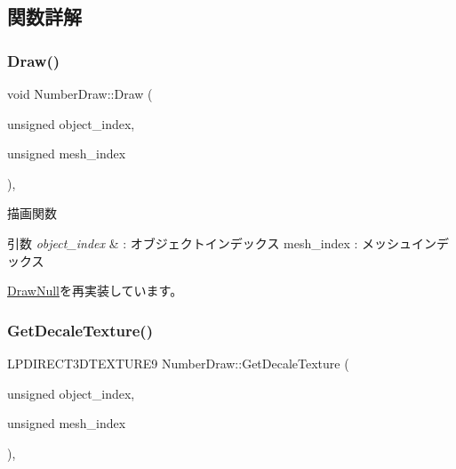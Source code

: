 \subsection{関数詳解}
\mbox{\label{class_number_draw_a15e4e602b3f9372349d0b6ff9e4fc423}} 
\subsubsection{\texorpdfstring{Draw()}{Draw()}}
{\footnotesize\ttfamily void Number\+Draw\+::\+Draw (\begin{DoxyParamCaption}\item[{unsigned}]{object\+\_\+index,  }\item[{unsigned}]{mesh\+\_\+index }\end{DoxyParamCaption})\hspace{0.3cm}{\ttfamily [override]}, {\ttfamily [virtual]}}



描画関数 


\begin{DoxyParams}{引数}
{\em object\+\_\+index} & \+: オブジェクトインデックス mesh\+\_\+index \+: メッシュインデックス \\
\hline
\end{DoxyParams}


\mbox{\hyperlink{class_draw_null_afe50f6fd820b18d673f70f048743f339}{Draw\+Null}}を再実装しています。

\mbox{\label{class_number_draw_ad1d9a4cee49e7bddce51b5c58e739de9}} 
\subsubsection{\texorpdfstring{Get\+Decale\+Texture()}{GetDecaleTexture()}}
{\footnotesize\ttfamily L\+P\+D\+I\+R\+E\+C\+T3\+D\+T\+E\+X\+T\+U\+R\+E9 Number\+Draw\+::\+Get\+Decale\+Texture (\begin{DoxyParamCaption}\item[{unsigned}]{object\+\_\+index,  }\item[{unsigned}]{mesh\+\_\+index }\end{DoxyParamCaption})\hspace{0.3cm}{\ttfamily [override]}, {\ttfamily [virtual]}}



